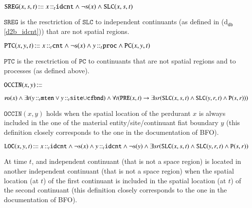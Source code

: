 \documentclass[ao]{iosart2x}
\newcommand{\bfoDefLabel}{\textrm{d$_\texttt{b}$}}
\newcommand{\dbDefLabel}{\textrm{d$_\texttt{db}$}}
\newcounter{cntdbdf}
\newcommand{\dbdf}[1]{\refstepcounter{cntdbdf}\begin{small}{\bf \dbDefLabel\thecntdbdf\label{#1}}\end{small}}
\newcommand{\refbfodf}[1]{({\bfoDefLabel}\ref{#1})}
\newcommand{\refdbdf}[1]{({\dbDefLabel}\ref{#1})}
\newcommand{\pr}[1]{\mathtt{#1}}
\newcommand{\cn}[1]{\mathtt{#1}}
\newcommand\textequal{%
 \rule[.08ex]{5pt}{0.35pt}\llap{\rule[.78ex]{5pt}{0.35pt}}}
\newcommand{\sdef}{{\hspace{1.5pt}:\hspace{-2.5pt}\textequal\hspace{3pt}}}
\newcommand{\bfo}{{\textsc{bfo}}}
\newcommand {\PDdcat} {\textsc{pd}}
\newcommand {\Sdcat} {\textsc{s}}
\newcommand {\TPd} {\ensuremath{\pr{tP}}}
\newcommand {\Pd} {\ensuremath{\pr{P}}}
\newcommand {\PREd} {\ensuremath{\pr{PRE}}}
\newcommand {\PCd} {\ensuremath{\pr{PC}}}
\newcommand {\SLCd} {\ensuremath{\pr{SLC}}}
\newcommand{\cntbcat}{\cn{cnt}}
\newcommand{\idcntbcat}{\cn{idcnt}}
\newcommand{\mtenbcat}{\cn{mten}}
\newcommand{\sitebcat}{\cn{site}}
\newcommand{\cfbndbcat}{\cn{cfbnd}}
\newcommand{\procbcat}{\cn{proc}}
\newcommand{\bfoiof}[1]{{\,::_{#1\:\!}}}
\newcommand{\bfooccurs}{\pr{OCCIN}}
\newcommand{\bfolocated}{\pr{LOC}}
\newcommand{\bfosregof}{\pr{SREG}}
\newcommand{\bfoparticin}{\pr{PTC}}
\begin{document}

\item[\dbdf{d2b_sregof}] $\bfosregof(x,s,t) \sdef x \bfoiof{t} \idcntbcat \land \neg\Sdcat(x) \land \SLCd(x,s,t)$

\vspace{1pt}
$\bfosregof$ is the resctriction of $\SLCd$ to independent continuants (as defined in \refdbdf{d2b_idcnt}) that are not spatial regions.  

\item[\dbdf{d2b_partic}] $\bfoparticin(x,y,t) \sdef x \bfoiof{t} \cntbcat \land \neg\Sdcat(x) \land y \bfoiof{t} \procbcat \land \PCd(x,y,t)$

\vspace{1pt}
$\bfoparticin$ is the resctriction of $\PCd$ to continuants that are not spatial regions and to processes (as defined above).  

\item[\dbdf{d2b_occurs}] $\bfooccurs(x,y) \sdef $\parbox[t]{\textwidth} {$\PDdcat(x) \land \exists t(y \bfoiof{t} \mtenbcat \lor y \bfoiof{t} \sitebcat{\cup}\cfbndbcat) \land \\ \forall t(\PREd(x,t) \to \exists sr(\SLCd(x,s,t) \land \SLCd(y,r,t) \land \Pd(s,r)))$}

\vspace{1pt}
$\bfooccurs(x,y)$ holds when the spatial location of the perdurant $x$ is always included in the one of the material entity/site/continuant fiat boundary $y$ (this definition closely corresponds to the one in the documentation of BFO).


\item[\dbdf{d2b_located}] $\bfolocated(x,y,t) \sdef x \bfoiof{t} \idcntbcat \land \neg\Sdcat(x) \land y \bfoiof{t} \idcntbcat \land \neg\Sdcat(y) \land
\exists sr(\SLCd(x,s,t) \land \SLCd(y,r,t) \land \Pd(s,r))$

\vspace{1pt}
At time $t$, and independent continuant (that is not a space region) is located in another independent continuant (that is not a space region) when the spatial location (at $t$) of the first continuant is included in the spatial location (at $t$) of the second continuant (this definition closely corresponds to the one in the documentation of BFO).
\end{document}
